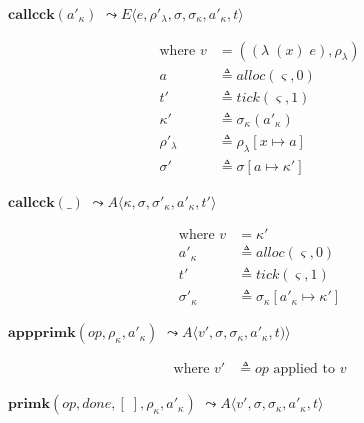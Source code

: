 \documentclass[12pt,draft]{article}
\newcommand{\singlelamsyn}[2]{(\lambda\;(#1)\;#2)}
\begin{document}
\begin{multicols*}{2}
\begin{center}
  $\textbf{callcck}(a'_\kappa)$
  $\leadsto E\langle e , \rho'_\lambda , \sigma , \sigma_\kappa , a'_\kappa , t \rangle$
\end{center}
\vspace{-7mm}
\begin{align*}
  \text{where } v &= (\singlelamsyn{x}{e} , \rho_{\lambda}) \\
  a &\triangleq alloc(\varsigma, 0) \\
  t' &\triangleq tick(\varsigma, 1) \\
  \kappa' &\triangleq \sigma_\kappa(a'_\kappa) \\
  \rho'_{\lambda} &\triangleq \rho_{\lambda}[x \mapsto a] \\
  \sigma' &\triangleq \sigma[a \mapsto \kappa']
\end{align*}
\begin{center}
  $\textbf{callcck}(\_)$
  $\leadsto A\langle \kappa , \sigma , \sigma'_\kappa , a'_\kappa  , t' \rangle$
\end{center}
\vspace{-7mm}
\begin{align*}
  \text{where }
  v &= \kappa' \\
  a'_\kappa &\triangleq alloc(\varsigma, 0) \\
  t' &\triangleq tick(\varsigma, 1) \\
  \sigma'_\kappa &\triangleq \sigma_\kappa[a'_\kappa \mapsto \kappa']
\end{align*}
\begin{center}
  $\textbf{appprimk}(op, \rho_\kappa, a'_\kappa)$
  $\leadsto A\langle v' , \sigma , \sigma_\kappa , a'_\kappa ,t) \rangle$
\end{center}
\vspace{-7mm}
\begin{align*}
\text{where } v' &\triangleq op \text{ applied to } v
\end{align*}
\begin{center}
  $\textbf{primk}(op, done, [\;], \rho_\kappa, a'_\kappa)$
  $\leadsto A\langle v' , \sigma , \sigma_\kappa , a'_\kappa , t \rangle$
\end{center}
\vspace{-7mm}
\begin{align*}

\end{align*}
\end{multicols*}
\end{document}
